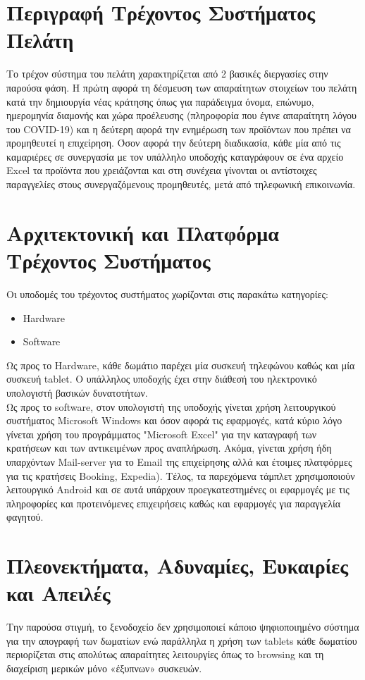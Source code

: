 \section{Περιγραφή Τρέχοντος Συστήματος Πελάτη}
Το τρέχον σύστημα του πελάτη χαρακτηρίζεται από 2 βασικές διεργασίες στην παρούσα φάση. Η πρώτη
αφορά τη δέσμευση των απαραίτητων στοιχείων του πελάτη κατά την δημιουργία νέας κράτησης όπως 
για παράδειγμα όνομα, επώνυμο, ημερομηνία διαμονής και χώρα προέλευσης (πληροφορία που έγινε 
απαραίτητη λόγου του COVID-19) και η  δεύτερη  αφορά την ενημέρωση των προϊόντων που πρέπει να 
προμηθευτεί η επιχείρηση. Όσον αφορά την δεύτερη διαδικασία, κάθε μία από τις καμαριέρες σε 
συνεργασία με τον υπάλληλο υποδοχής καταγράφουν σε ένα αρχείο Excel τα προϊόντα που χρειάζονται 
και στη συνέχεια γίνονται οι αντίστοιχες παραγγελίες στους συνεργαζόμενους  προμηθευτές, μετά από 
τηλεφωνική επικοινωνία.

\section{Αρχιτεκτονική και Πλατφόρμα Τρέχοντος Συστήματος}
\noindent
Οι υποδομές του τρέχοντος συστήματος χωρίζονται στις παρακάτω κατηγορίες:
\begin{itemize}
	\item Hardware
	\item Software
\end{itemize}
	
\noindent
Ως προς το Hardware, κάθε δωμάτιο παρέχει μία συσκευή τηλεφώνου καθώς και μία συσκευή tablet. Ο
υπάλληλος υποδοχής έχει στην διάθεσή του ηλεκτρονικό υπολογιστή βασικών δυνατοτήτων.\\
	
\noindent
Ως προς το software, στον υπολογιστή της υποδοχής γίνεται χρήση λειτουργικού συστήματος Microsoft 
Windows και όσον αφορά τις εφαρμογές, κατά κύριο λόγο γίνεται χρήση του προγράμματος "Microsoft 
Excel" για την καταγραφή των κρατήσεων και των αντικειμένων προς αναπλήρωση. Ακόμα, γίνεται χρήση 
ήδη  υπαρχόντων Mail-server για το Email της επιχείρησης αλλά και έτοιμες πλατφόρμες για τις 
κρατήσεις  Booking, Expedia). Τέλος, τα παρεχόμενα τάμπλετ χρησιμοποιούν λειτουργικό Android και σε 
αυτά  υπάρχουν προεγκατεστημένες οι εφαρμογές με τις πληροφορίες και προτεινόμενες επιχειρήσεις 
καθώς και εφαρμογές για παραγγελία φαγητού.\\


\section{Πλεονεκτήματα, Αδυναμίες, Ευκαιρίες και Απειλές}
Την παρούσα στιγμή, το ξενοδοχείο δεν χρησιμοποιεί κάποιο ψηφιοποιημένο σύστημα για την απογραφή 
των δωματίων ενώ παράλληλα η χρήση των tablets κάθε δωματίου περιορίζεται στις απολύτως  
απαραίτητες λειτουργίες όπως το browsing και τη διαχείριση μερικών μόνο «έξυπνων» συσκευών. \\ 

